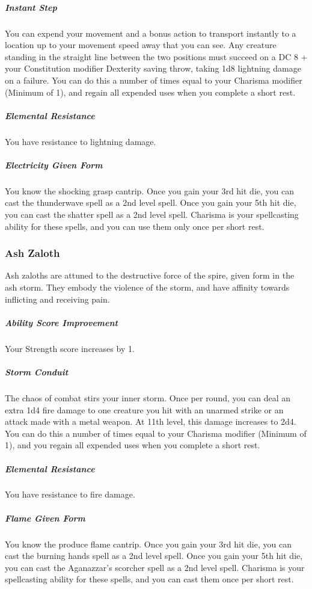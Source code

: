     \subparagraph{Instant Step} You can expend your movement and a bonus action to transport instantly to a location up to your movement speed away that you can see.
    Any creature standing in the straight line between the two positions must succeed on a DC 8 + your Constitution modifier Dexterity saving throw, taking 1d8 lightning damage on a failure.
    You can do this a number of times equal to your Charisma modifier (Minimum of 1), and regain all expended uses when you complete a short rest.

    \subparagraph{Elemental Resistance} You have resistance to lightning damage.

    \subparagraph{Electricity Given Form} You know the shocking grasp cantrip.
    Once you gain your 3rd hit die, you can cast the thunderwave spell as a 2nd level spell.
    Once you gain your 5th hit die, you can cast the shatter spell as a 2nd level spell.
    Charisma is your spellcasting ability for these spells, and you can use them only once per short rest.

\subsubsection{Ash Zaloth}
    Ash zaloths are attuned to the destructive force of the spire, given form in the ash storm.
    They embody the violence of the storm, and have affinity towards inflicting and receiving pain.

    \subparagraph{Ability Score Improvement} Your Strength score increases by 1.

    \subparagraph{Storm Conduit} The chaos of combat stirs your inner storm.
    Once per round, you can deal an extra 1d4 fire damage to one creature you hit with an unarmed strike or an attack made with a metal weapon.
    At 11th level, this damage increases to 2d4.
    You can do this a number of times equal to your Charisma modifier (Minimum of 1), and you regain all expended uses when you complete a short rest.

    \subparagraph{Elemental Resistance} You have resistance to fire damage.

    \subparagraph{Flame Given Form} You know the produce flame cantrip.
    Once you gain your 3rd hit die, you can cast the burning hands spell as a 2nd level spell.
    Once you gain your 5th hit die, you can cast the Aganazzar's scorcher spell as a 2nd level spell.
    Charisma is your spellcasting ability for these spells, and you can cast them once per short rest.

